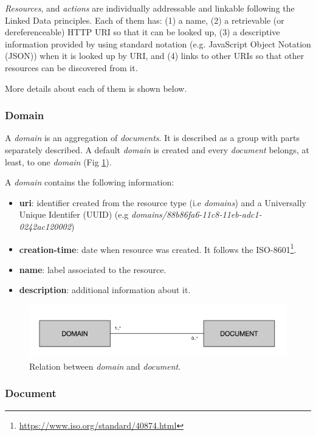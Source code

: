 \textit{Resources}, and \textit{actions} are individually addressable and linkable \citep{Turchi2012a} following the Linked Data principles\citep{Bizer2009}. Each of them has: (1) a name, (2) a retrievable (or dereferenceable) HTTP URI so that it can be looked up, (3) a descriptive information provided by using standard notation (e.g. JavaScript Object Notation (JSON)) when it is  looked up by URI, and (4) links to other URIs so that other resources can be discovered from it.

More details about each of them is shown below.

\subsubsection{Domain}

A \textit{domain} is an aggregation of \textit{documents}. It is described as a group with parts separately described. A default \textit{domain} is created and every \textit{document} belongs, at least, to one \textit{domain} (Fig \ref{fig:librairy-model-domain}).

A \textit{domain} contains the following information: 
\begin{itemize}
\item \textbf{uri}: identifier created from the resource type (i.e \textit{domains}) and a Universally Unique Identifer (UUID) (e.g \textit{domains/88b86fa6-11c8-11eb-adc1-0242ac120002})
\item \textbf{creation-time}: date when resource was created. It follows the ISO-8601\footnote{\url{https://www.iso.org/standard/40874.html}}.
\item \textbf{name}: label associated to the resource.
\item \textbf{description}: additional information about it.
\end{itemize}

\begin{figure}
  \center
  \includegraphics[scale=0.45]{model-domain.png}
  \caption{Relation between \textit{domain} and \textit{document}.}
  \label{fig:librairy-model-domain}
\end{figure}

\subsubsection{Document}

